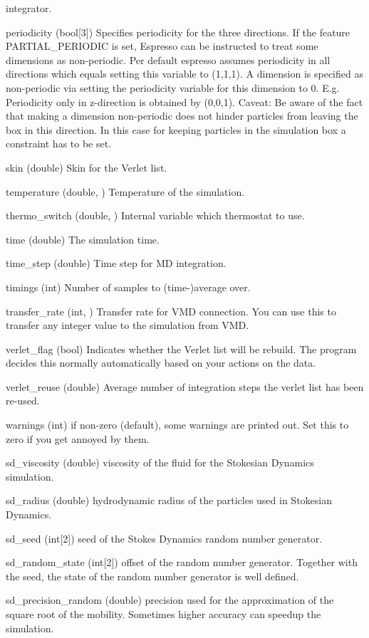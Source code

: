 \begin{globvar}
  integrator.
\item[periodicity] (bool[3]) Specifies periodicity for the three
  directions. If the feature PARTIAL_PERIODIC is set, Espresso can be instructed to treat some dimensions as non-periodic. Per default espresso assumes periodicity in all directions which equals setting this variable to (1,1,1). A dimension is specified as non-periodic via setting the periodicity variable for this dimension to 0. E.g. Periodicity only in z-direction is obtained by (0,0,1). Caveat: Be aware of the fact that making a dimension non-periodic does not hinder particles from leaving the box in this direction. In this case for keeping particles in the simulation box a constraint has to be set.
\item[skin] (double) Skin for the Verlet list.
\item [temperature] (double, \ro) Temperature of the
  simulation.
\item[thermo_switch] (double, \ro) Internal variable which thermostat
  to use. 
\item[time] (double) The simulation time.
\item[time_step] (double) Time step for MD integration.
\item[timings] (int) Number of samples to (time-)average over.
\item[transfer_rate] (int, \ro) Transfer rate for VMD connection. You
  can use this to transfer any integer value to the simulation from
  VMD.
\item[verlet_flag] (bool) Indicates whether the Verlet list will be
  rebuild. The program decides this normally automatically based on
  your actions on the data.
\item[verlet_reuse] (double) Average number of integration steps the
  verlet list has been re-used.
\item[warnings] (int) if non-zero (default), some warnings are printed
  out. Set this to zero if you get annoyed by them.
\item[sd_viscosity] (double) viscosity of the fluid for the Stokesian Dynamics
  simulation.
\item[sd_radius] (double) hydrodynamic radius of the particles used in
  Stokesian Dynamics.
\item[sd_seed] (int[2]) seed of the Stokes Dynamics random number generator.
\item[sd_random_state] (int[2]) offset of the random number
  generator. Together with the seed, the state of the random number generator
  is well defined.
\item[sd_precision_random] (double) precision used for the approximation of
  the square root of the mobility. Sometimes higher accuracy can speedup the
  simulation.
\end{globvar}


